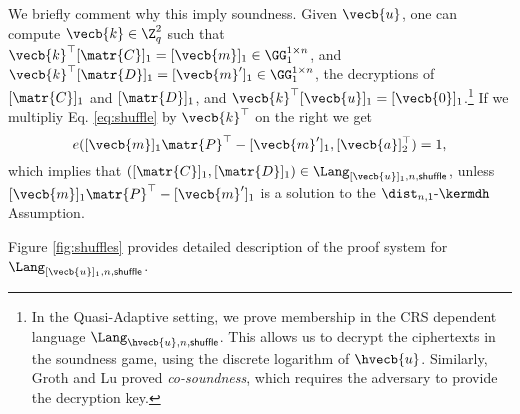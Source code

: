 We briefly comment why this imply soundness. Given $\vecb{u}$, one can compute $\vecb{k}\in\Z_q^2$ such that $\vecb{k}^\top[\matr{C}]_1=[\vecb{m}]_1\in\GG_1^{1\times n}$, and $\vecb{k}^\top[\matr{D}]_1=[\vecb{m}']_1\in\GG_1^{1\times n}$, the decryptions of $[\matr{C}]_1$ and $[\matr{D}]_1$, and $\vecb{k}^\top[\vecb{u}]_1=[\vecb{0}]_1$.\footnote{In the Quasi-Adaptive setting, we prove membership in the CRS dependent language $\Lang_{\hvecb{u},n,\mathsf{shuffle}}$. This allows us to decrypt the ciphertexts in the soundness game, using the discrete logarithm of $\hvecb{u}$. Similarly, Groth and Lu proved \emph{co-soundness}, which requires the adversary to provide the decryption key.} If we multipliy Eq. \ref{eq:shuffle} by $\vecb{k}^\top$ on the right we get
$$
e([\vecb{m}]_1\matr{P}^\top-[\vecb{m}']_1,[\vecb{a}]_2^\top)=1,
$$
which implies that $([\matr{C}]_1,[\matr{D}]_1)\in\Lang_{[\vecb{u}]_1,n,\mathsf{shuffle}}$, unless $[\vecb{m}]_1\matr{P}^\top-[\vecb{m}']_1$ is a solution to the $\dist_{n,1}\mbox{-}\kermdh$ Assumption.



Figure \ref{fig:shuffles} provides detailed description of the proof system for $\Lang_{[\vecb{u}]_1,n,\mathsf{shuffle}}$.

